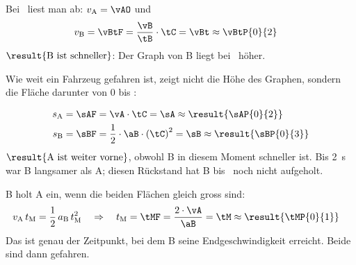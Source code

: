 \begin{abcliste}
\abc Bei \tCO\ liest man ab: $v_\mathrm{A} = \vAO$ und
\begin{align}
 v_\mathrm{B} &= \vBtF = \frac{\vB}{\tB}\cdot\tC = \vBt \approx \vBtP{0}{2}
\end{align}
$\result{\text{B ist schneller}}$: Der Graph von B liegt bei \tCO\ höher.

\abc Wie weit ein Fahrzeug gefahren ist, zeigt nicht die Höhe des Graphen, sondern die Fläche darunter von $0$ bis \tCO:
\begin{center}
\end{center}
\begin{align}
 s_\mathrm{A} &= \sAF = \vA\cdot\tC = \sA \approx \result{\sAP{0}{2}} \\
 s_\mathrm{B} &= \sBF = \frac{1}{2}\cdot\aB\cdot\left(\tC\right)^2 = \sB \approx \result{\sBP{0}{3}}
\end{align}
$\result{\text{A ist weiter vorne}}$, obwohl B in diesem Moment schneller ist. Bis \SI{2}{\second} war B langsamer als A; diesen Rückstand hat B bis \tCO\ noch nicht aufgeholt.

\abc B holt A ein, wenn die beiden Flächen gleich gross sind:
\begin{align}
 v_\mathrm{A}\,t_\mathrm{M} &= \frac{1}{2}\,a_\mathrm{B}\,t_\mathrm{M}^2 \quad\Rightarrow\quad t_\mathrm{M} = \tMF = \frac{2\cdot\vA}{\aB} = \tM \approx \result{\tMP{0}{1}}
\end{align}
Das ist genau der Zeitpunkt, bei dem B seine Endgeschwindigkeit erreicht. Beide sind dann  gefahren.
\end{abcliste}
